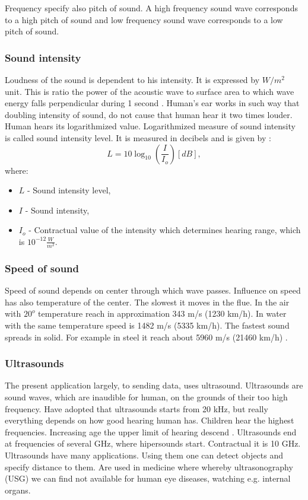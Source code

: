 \documentclass[11pt,titlepage]{article}
\theoremstyle{plain}
\begin{document}
Frequency specify also pitch of sound. A high frequency sound wave corresponds to a high pitch of sound and low frequency sound wave corresponds to a low pitch of sound.

\subsubsection{Sound intensity}
Loudness of the sound is dependent to his intensity. It is expressed by $W/m^2$ unit. This is ratio the power of the acoustic wave to surface area to which wave energy falls perpendicular during 1 second \cite{sound_intensity}. Human's ear works in such way that doubling intensity of sound, do not cause that human hear it two times louder. Human hears its logarithmized value. Logarithmized measure of sound intensity is called sound intensity level. It is measured in decibels and is given by \cite{decibels}:
\begin{equation}
	L = 10\log_{10}\left(\frac{I}{I_o}\right)  [dB],
\end{equation}
where:
\begin{itemize}
	\item $L$ - Sound intensity level,
	\item $I$ - Sound intensity,
	\item $I_o$ - Contractual value of the intensity which determines hearing range, which is $10^{-12}\frac{W}{m^2}.$
\end{itemize}
\subsubsection{Speed of sound}

Speed of sound depends on center through which wave passes. Influence on speed has also temperature of the center. The slowest it moves in the flue. In the air with $20^o$ temperature reach in  approximation 343 m/s (1230 km/h). In water with the same temperature speed is 1482 m/s (5335 km/h). The fastest sound spreads in solid. For example in steel it reach about 5960 m/s (21460 km/h) \cite{sound_speed}.

\subsubsection{Ultrasounds}
The present application largely, to sending data, uses ultrasound. Ultrasounds are sound waves, which are inaudible for human, on the grounds of their too high frequency. Have adopted that ultrasounds starts from 20 kHz, but really everything depends on how good hearing human has. Children hear the highest frequencies. Increasing age the upper limit of hearing descend \cite{limit_sound}. Ultrasounds end at frequencies of several GHz, where hipersounds start. Contractual it is 10 GHz.  Ultrasounds have many applications. Using them one can detect objects and specify distance to them. Are used in medicine where whereby ultrasonography (USG) we can find not available for human eye diseases, watching e.g. internal organs. 
\end{document}
